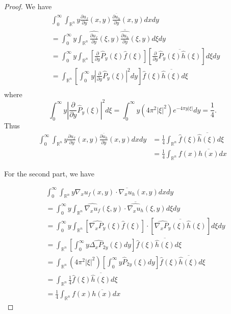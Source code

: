 \begin{enumerate}
\begin{proof}
	We have
	\begin{align*}
		& \int_0^{\infty} \int_{\mathbb{R}^n} y \frac{\partial u_f}{\partial y}(x, y) \frac{\overline{\partial u_h}}{\partial y}(x, y) d x d y \\
		&= \int_0^{\infty} y \int_{\mathbb{R}^n} \widehat{ \frac{\partial u_f}{\partial y}}(\xi, y) \overline{\widehat{ \frac{\partial u_h}{\partial y}}}(\xi, y) d \xi d y \\	
		&= \int_0^{\infty} y \int_{\mathbb{R}^n} \left[ \frac{\partial}{\partial y} \hat{P}_y(\xi) \hat{f}(\xi) \right] \left[ \frac{\partial}{\partial y} \overline{\hat{P}_y(\xi) \hat{h}(\xi)} \right] d \xi d y \\
		&= \int_{\mathbb{R}^n} \left[ \int_0^{\infty} y \left| \frac{\partial}{\partial y} \hat{P}_y(\xi) \right|^2 d y \right] \hat{f}(\xi) \overline{\hat{h}(\xi)} d \xi \\	
	\end{align*}
	where
	\[
		\int_0^{\infty} y \left| \frac{\partial}{\partial y} \hat{P}_y(\xi) \right|^2 d \xi = \int_0^{\infty} y (4 \pi^2 |\xi|^2) e^{-4 \pi y |\xi|} dy = \frac{1}{4}
	.\]	
	Thus
	\begin{align*}
		\int_0^{\infty} \int_{\mathbb{R}^n} y \frac{\partial u_f}{\partial y}(x, y) \frac{\overline{\partial u_h}}{\partial y}(x, y) d x d y 
		&= \frac{1}{4} \int_{\mathbb{R}^n} \hat{f}(\xi) \overline{\hat{h}(\xi)} d \xi \\
		&= \frac{1}{4} \int_{\mathbb{R}^n} f(x) \overline{h(x)} d x
	\end{align*}

	For the second part, we have

	\begin{align*}
		& \int_0^{\infty} \int_{\mathbb{R}^n} y \nabla_x u_f(x, y) \cdot \overline{\nabla_x u_h}(x, y) d x d y \\
		&= \int_0^{\infty} y \int_{\mathbb{R}^n} \widehat{\nabla_x u_f}(\xi, y) \cdot \overline{\widehat{\nabla_x u_h}}(\xi, y) d \xi d y \\
		&= \int_0^{\infty} y \int_{\mathbb{R}^n} \left[ \widehat{\nabla_x P_y}(\xi) \hat{f}(\xi) \right] \cdot \left[ \overline{\widehat{\nabla_x P_y}(\xi) \hat{h}(\xi)} \right] d \xi d y \\
		&= \int_{\mathbb{R}^n} \left[ \int_0^{\infty} y \widehat{\Delta_x {P}_{2y}} (\xi) d y \right] \hat{f}(\xi) \overline{\hat{h}(\xi)} d \xi \\
		&= \int_{\mathbb{R}^n} (4 \pi^2 |\xi|^2) \left[ \int_0^{\infty} y \hat{P}_{2y} (\xi) d y \right] \hat{f}(\xi) \overline{\hat{h}(\xi)} d \xi \\
		&= \int_{\mathbb{R}^n} \frac{1}{4} \hat{f}(\xi) \overline{\hat{h}(\xi)} d \xi \\
		&= \frac{1}{4} \int_{\mathbb{R}^n} f(x) \overline{h(x)} d x
	\end{align*}


\end{proof}
\end{enumerate}

